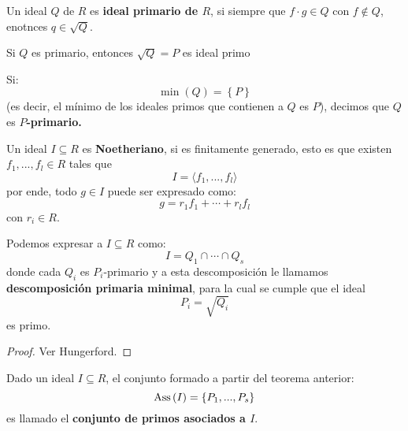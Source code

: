 \documentclass[12pt]{report}
\newcounter{it}
\theoremstyle{largebreak}
\newcommand{\Ass}[1]{\ensuremath{\textup{Ass}\left(#1\right)}}
\begin{document}
    \begin{mydef}
        Un ideal $Q$ de $R$ es \textbf{ideal primario de $R$}, si siempre que $f\cdot g\in Q$ con $f\notin Q$, enotnces $q\in\sqrt{Q}$.
    \end{mydef}

    \begin{obs}
        Si $Q$ es primario, entonces $\sqrt{Q}=P$ es ideal primo
    \end{obs}

    \begin{mydef}
        Si:
        \begin{equation*}
            \min\left(Q\right)=\left\{P \right\}
        \end{equation*}
        (es decir, el mínimo de los ideales primos que contienen a $Q$ es $P$), decimos que $Q$ es \textbf{$P$-primario.}
    \end{mydef}

    \begin{mydef}
        Un ideal $I\subseteq R$ es \textbf{Noetheriano}, si es finitamente generado, esto es que existen $f_1,...,f_l\in R$ tales que
        \begin{equation*}
            I=\langle f_1,...,f_l\rangle
        \end{equation*}
        por ende, todo $g\in I$ puede ser expresado como:
        \begin{equation*}
            g=r_1f_1+\cdots+r_lf_l
        \end{equation*}
        con $r_i\in R$.
    \end{mydef}

    \begin{theor}
        Podemos expresar a $I\subseteq R$ como:
        \begin{equation*}
            I=Q_1\cap\cdots\cap Q_s
        \end{equation*}
        donde cada $Q_i$ es $P_i$-primario y a esta descomposición le llamamos \textbf{descomposición primaria minimal}, para la cual se cumple que el ideal
        \begin{equation*}
            P_i=\sqrt{Q_i}
        \end{equation*}
        es primo.
    \end{theor}

    \begin{proof}
        Ver Hungerford.
    \end{proof}

    \begin{mydef}
        Dado un ideal $I\subseteq R$, el conjunto formado a partir del teorema anterior:
        \begin{equation*}
            \Ass{I}=\left\{P_1,...,P_s \right\}
        \end{equation*}
        es llamado el \textbf{conjunto de primos asociados a $I$}.
    \end{mydef}
\end{document}

